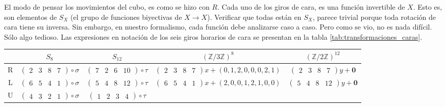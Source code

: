 \documentclass{article}
\theoremstyle{definition}
\newcommand{\Z}{\mathbb{Z}}
\begin{document}
El modo de pensar los movimientos del cubo, es como se hizo con $R$. Cada uno de los giros de cara, es una función invertible de $X$. Esto es, son elementos de $S_X$ (el grupo de funciones biyectivas de $X\to X$). Verificar que todas están en $S_X$, parece trivial porque toda rotación de cara tiene su inversa. Sin embargo, en nuestro formalismo, cada función debe analizarse caso a caso. Pero como se vio, no es nada difícil. Sólo algo tedioso. Las expresiones en notación de los seis giros horarios de cara se presentan en la tabla \ref{tab:transformaciones_caras}.
\begin{table}
    \small
    \setlength{\arraycolsep}{2pt}
    \renewcommand{\arraystretch}{1.2}
    \centering
    \begin{tabular}{|c|c|c|c|c|}
        \hline
                                                                 & $S_{8}$ & $S_{12}$ & $(\Z/3\Z)^{8}$ & $(\Z/2\Z)^{12}$ \\
        \hline
        R                                                        &
        $\begin{pmatrix}2&3&8&7\end{pmatrix}\circ\sigma$         &
        $\begin{pmatrix}7&2&6&10\end{pmatrix}\circ\tau $         &
        $\begin{pmatrix}2&3&8&7\end{pmatrix}x+(0,1,2,0,0,0,2,1)$ &
        $\begin{pmatrix}2&3&8&7\end{pmatrix}y+\mathbf{0}$
        \\
        L                                                        &
        $\begin{pmatrix}6&5&4&1\end{pmatrix}\circ\sigma$         &
        $\begin{pmatrix}5&4&8&12\end{pmatrix}\circ\tau$          &
        $\begin{pmatrix}6&5&4&1\end{pmatrix}x+(2,0,0,1,2,1,0,0)$ &
        $\begin{pmatrix}5&4&8&12\end{pmatrix}y+\mathbf{0}$
        \\
        U                                                        &
        $\begin{pmatrix}4&3&2&1\end{pmatrix}\circ\sigma$         &
        $\begin{pmatrix}1&2&3&4\end{pmatrix}\circ\tau$           &

\end{tabular}
\end{table}
\end{document}
